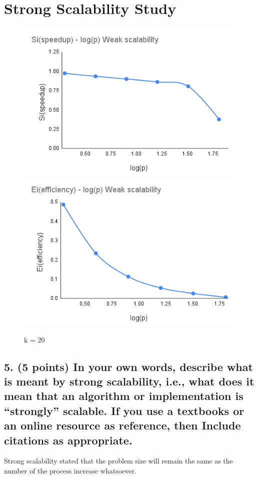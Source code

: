 \documentclass[pstricks,border=14pt,14pt]{article}
\begin{document}
\section*{Strong Scalability Study}
\begin{figure}[H]
    \centering
    \includegraphics[width=12cm]{Weak_scalability_Si_logP.png}
    \includegraphics[width=12cm]{Weak_scalability_Ei_logP.png}
    \caption{k = 20}
    \label{fig:my_label}
\end{figure}
\subsection*{5. (5 points) In your own words, describe what is meant by strong scalability, i.e., what does it mean that an algorithm or implementation is “strongly” scalable. If you use a textbooks or an online resource as reference, then Include citations as appropriate.}
Strong scalability stated that the problem size will remain the same as the number of the process increase whatsoever. 
\end{document}
